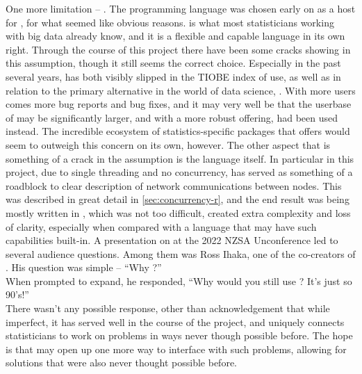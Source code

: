 One more limitation -- \R{}.
The \R{} programming language was chosen early on as a host for \lsr{}, for what seemed like obvious reasons.
\R{} is what most statisticians working with big data already know, and it is a flexible and capable language in its own right.
Through the course of this project there have been some cracks showing in this assumption, though it still seems the correct choice.
Especially in the past several years, \R{} has both visibly slipped in the TIOBE index of use, as well as in relation to the primary alternative in the world of data science, .
With more users comes more bug reports and bug fixes, and it may very well be that the userbase of \lsr{} may be significantly larger, and with a more robust offering, had  been used instead.
The incredible ecosystem of statistics-specific packages that \R{} offers would seem to outweigh this concern on its own, however.
The other aspect that is something of a crack in the assumption is the language itself.
In particular in this project, due to single threading and no concurrency, \R{} has served as something of a roadblock to clear description of network communications between nodes.
This was described in great detail in \cref{sec:concurrency-r}, and the end result was \orcv{} being mostly written in , which was not too difficult, created extra complexity and loss of clarity, especially when compared with a language that may have such capabilities built-in.
A presentation on \lsr{} at the 2022 NZSA Unconference led to several audience questions.
Among them was Ross Ihaka, one of the co-creators of \R{}.
His question was simple -- ``Why \R{}?''\\
When prompted to expand, he responded, ``Why would you still use \R{}? It's just so 90's!''\\
There wasn't any possible response, other than acknowledgement that while imperfect, it has served well in the course of the project, and uniquely connects statisticians to work on problems in ways never though possible before.
The hope is that \lsr{} may open up one more way to interface with such problems, allowing for solutions that were also never thought possible before.
